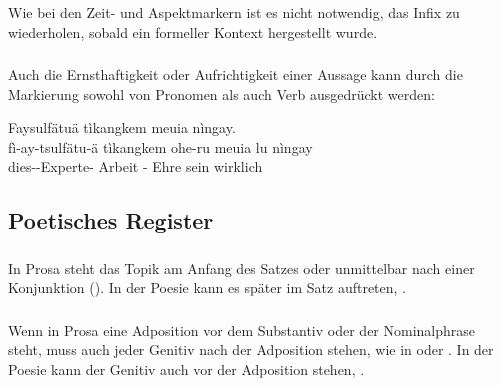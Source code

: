 \subsubsection{} Wie bei den Zeit- und Aspektmarkern ist es nicht notwendig, das Infix  zu wiederholen, sobald ein formeller Kontext hergestellt wurde.

\subsubsection{} Auch die Ernsthaftigkeit oder Aufrichtigkeit einer Aussage kann durch die Markierung sowohl von Pronomen als auch Verb ausgedrückt werden:

\begin{interlin}
\glll Faysulfätuä tìkangkem  meuia  nìngay. \\
      fì-ay-tsulfätu-ä tìkangkem ohe-ru meuia lu nìngay \\
      dies--Experte- Arbeit - Ehre sein wirklich \\
 \Ipawl{}
\end{interlin}

\subsection{Poetisches Register}

\subsubsection{} In Prosa steht das Topik am Anfang des Satzes oder unmittelbar nach einer Konjunktion (). In der Poesie kann es später im Satz auftreten,  .

\subsubsection{} Wenn in Prosa eine Adposition vor dem Substantiv oder der Nominalphrase steht, muss auch jeder Genitiv nach der Adposition stehen, wie in  oder  . In der Poesie kann der Genitiv auch vor der Adposition stehen, . 

